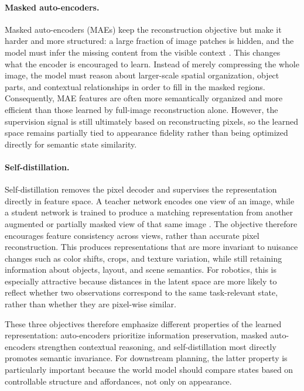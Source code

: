 \documentclass[12pt]{report}
\begin{document}
\paragraph{Masked auto-encoders.}
Masked auto-encoders (MAEs) keep the reconstruction objective but make it harder and more structured: a large fraction of image patches is hidden, and the model must infer the missing content from the visible context \cite{he2021mae}. This changes what the encoder is encouraged to learn. Instead of merely compressing the whole image, the model must reason about larger-scale spatial organization, object parts, and contextual relationships in order to fill in the masked regions. Consequently, MAE features are often more semantically organized and more efficient than those learned by full-image reconstruction alone. However, the supervision signal is still ultimately based on reconstructing pixels, so the learned space remains partially tied to appearance fidelity rather than being optimized directly for semantic state similarity.

\paragraph{Self-distillation.}
Self-distillation removes the pixel decoder and supervises the representation directly in feature space. A teacher network encodes one view of an image, while a student network is trained to produce a matching representation from another augmented or partially masked view of that same image \cite{oquab2023dinov2}. The objective therefore encourages feature consistency across views, rather than accurate pixel reconstruction. This produces representations that are more invariant to nuisance changes such as color shifts, crops, and texture variation, while still retaining information about objects, layout, and scene semantics. For robotics, this is especially attractive because distances in the latent space are more likely to reflect whether two observations correspond to the same task-relevant state, rather than whether they are pixel-wise similar.

\vspace{1em}
These three objectives therefore emphasize different properties of the learned representation: auto-encoders prioritize information preservation, masked auto-encoders strengthen contextual reasoning, and self-distillation most directly promotes semantic invariance. For downstream planning, the latter property is particularly important because the world model should compare states based on controllable structure and affordances, not only on appearance.
\end{document}
